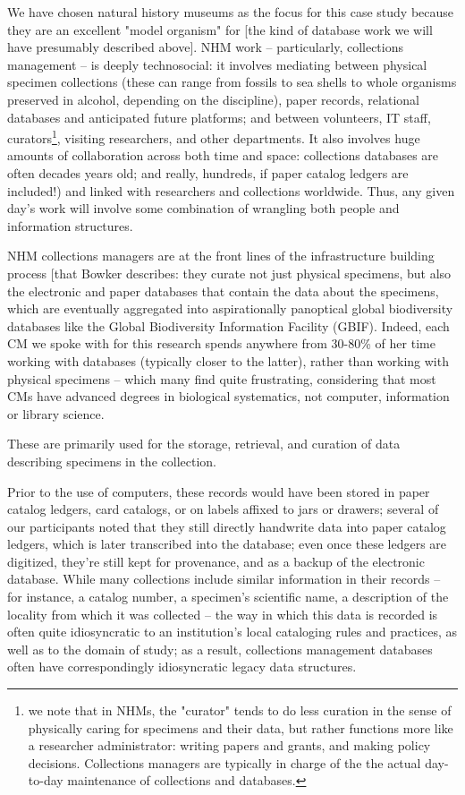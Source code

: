 We have chosen natural history museums as the focus for this case study because they are an excellent "model organism" for [the kind of database work we will have presumably described above]. NHM work -- particularly, collections management -- is deeply technosocial: it involves mediating between physical specimen collections (these can range from fossils to sea shells to whole organisms preserved in alcohol, depending on the discipline), paper records, relational databases and anticipated future platforms; and between volunteers, IT staff, curators\footnote{we note that in NHMs, the "curator" tends to do less curation in the sense of physically caring for specimens and their data, but rather functions more like a researcher administrator: writing papers and grants, and making policy decisions. Collections managers are typically in charge of the the actual day-to-day maintenance of collections and databases.}, visiting researchers, and other departments. It also involves huge amounts of collaboration across both time and space: collections databases are often decades years old; and really, hundreds, if paper catalog ledgers are included!) and linked with researchers and collections worldwide. Thus, any given day’s work will involve some combination of wrangling both people and information structures.

NHM collections managers are at the front lines of the infrastructure building process [that Bowker describes: they curate not just physical specimens, but also the electronic and paper databases that contain the data about the specimens, which are eventually aggregated into aspirationally panoptical global biodiversity databases like the Global Biodiversity Information Facility (GBIF).  Indeed, each CM we spoke with for this research spends anywhere from 30-80\% of her time working with databases (typically closer to the latter), rather than working with physical specimens – which many find quite frustrating, considering that most CMs have advanced degrees in biological systematics, not computer, information or library science.



These are primarily used for the storage, retrieval, and curation of data describing specimens in the collection.

Prior to the use of computers, these records would have been stored in paper catalog ledgers, card catalogs, or on labels affixed to jars or drawers; several of our participants noted that they still directly handwrite data into paper catalog ledgers, which is later transcribed into the database; even once these ledgers are digitized, they’re still kept for provenance, and as a backup of the electronic database. While many collections include similar information in their records – for instance, a catalog number, a specimen’s scientific name, a description of the locality from which it was collected – the way in which this data is recorded is often quite idiosyncratic to an institution’s local cataloging rules and practices, as well as to the domain of study; as a result, collections management databases often have correspondingly idiosyncratic legacy data structures.


